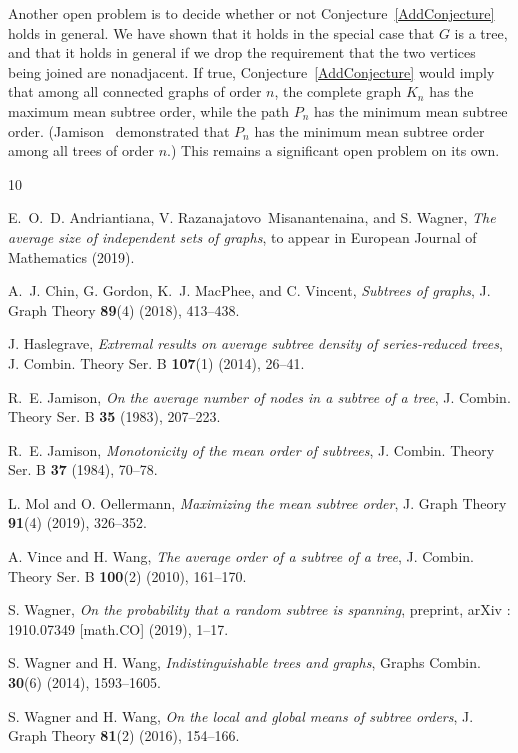 \documentclass[12pt]{article}
\theoremstyle{definition}
\begin{document}
Another open problem is to decide whether or not Conjecture~\ref{AddConjecture} holds in general.  We have shown that it holds in the special case that $G$ is a tree, and that it holds in general if we drop the requirement that the two vertices being joined are nonadjacent.  If true, Conjecture~\ref{AddConjecture} would imply that among all connected graphs of order $n$, the complete graph $K_n$ has the maximum mean subtree order, while the path $P_n$ has the minimum mean subtree order.  (Jamison~\cite{Jamison1983} demonstrated that $P_n$ has the minimum mean subtree order among all trees of order $n$.)  This remains a significant open problem on its own.

%
%

\begin{thebibliography}{10}

E.~O.~D. Andriantiana, V. Razanajatovo~Misanantenaina, and S. Wagner,
  \emph{{The average size of independent sets of graphs}}, to appear in
  European Journal of Mathematics (2019).

A.~J. Chin, G. Gordon, K.~J. MacPhee, and C. Vincent, \emph{{Subtrees of
  graphs}}, J. Graph Theory \textbf{89}({4}) (2018), 413--438.

J. Haslegrave, \emph{{Extremal results on average subtree density of
  series-reduced trees}}, J. Combin. Theory Ser. B \textbf{107}({1}) (2014),
  26--41.

R.~E. Jamison, \emph{{On the average number of nodes in a subtree of a tree}},
  J. Combin. Theory Ser. B \textbf{35} (1983), 207--223.

R.~E. Jamison, \emph{{Monotonicity of the mean order of subtrees}}, J. Combin.
  Theory Ser. B \textbf{37} (1984), 70--78.

L. Mol and O. Oellermann, \emph{{Maximizing the mean subtree order}}, J. Graph
  Theory \textbf{91}({4}) (2019), 326--352.

A. Vince and H. Wang, \emph{{The average order of a subtree of a tree}}, J.
  Combin. Theory Ser. B \textbf{100}({2}) (2010), 161--170.

S. Wagner, \emph{{On the probability that a random subtree is spanning}},
  preprint, arXiv : 1910.07349 [math.CO] (2019), 1--17.

S. Wagner and H. Wang, \emph{{Indistinguishable trees and graphs}}, Graphs
  Combin. \textbf{30}({6}) (2014), 1593--1605.

S. Wagner and H. Wang, \emph{{On the local and global means of subtree
  orders}}, J. Graph Theory \textbf{81}({2}) (2016), 154--166.

\end{thebibliography}
\end{document}
